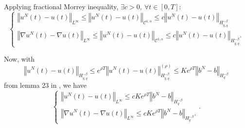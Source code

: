\documentclass{article}[12pt]
\newcommand{\norme}[1]{\left\Vert #1\right\Vert}
\begin{document}
\paragraph{}          
Applying fractional Morrey inequality, $\exists c>0,\ \forall t\in[0,T]$:
\begin{equation*}
        \begin{cases}
        \norme{u^N(t) - u(t)}_{L^\infty}\leq\norme{u^N(t) - u(t)}_{\mathcal{C}^{1,\alpha}}\leq c\norme{u^N(t)-u(t)}_{H^{-\beta}_{\tilde{q},q}}\\        
        \norme{\nabla u^N(t) - \nabla u(t)}_{L^\infty}\leq\norme{u^N(t) - u(t)}_{\mathcal{C}^{1,\alpha}}\leq c\norme{u^N(t)-u(t)}_{H^{-\beta}_{\tilde{q},q}}.
        \end{cases}        
\end{equation*}
        
        Now, with
        \begin{equation*}
        \norme{u^N(t)-u(t)}_{H^{-\beta}_{\tilde{q},q}}\leq e^{\rho T} \norme{u^N(t)-u(t)}_{H^{-\beta}_{\tilde{q},q}}^{(\rho)}\leq Ke^{\rho T}\norme{b^N-b}_{H^{-\beta}_{q}}
        \end{equation*} from lemma 23 in \cite{Fla-Iss-Rus-2017}, we have \begin{equation*}
        \begin{cases}
            \norme{u^N(t) - u(t)}_{L^\infty}\leq cKe^{\rho T}\norme{b^N-b}_{H^{-\beta}_{q}}\\        
            \norme{\nabla u^N(t) - \nabla u(t)}_{L^\infty}\leq c Ke^{\rho T}\norme{b^N-b}_{H^{-\beta}_{q}}.
        \end{cases} .
        \end{equation*}
        
\end{document}
